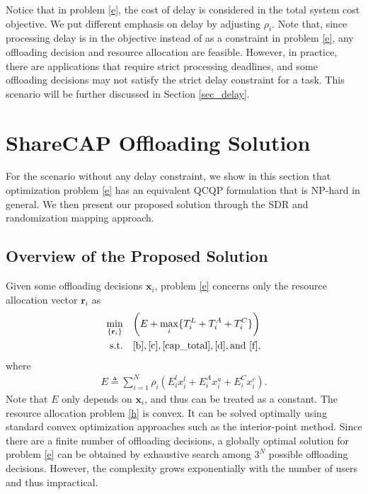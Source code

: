 \documentclass[10pt,journal,compsoc]{IEEEtran}
\begin{document}
Notice that in problem \eqref{e}, the cost of delay is considered in
the total system cost objective. We put different emphasis on delay
by adjusting $\rho_i$. Note that, since processing delay is in the
objective instead of as a constraint in problem \eqref{e}, any
offloading decision and resource allocation are feasible. However,
in practice, there are applications that require strict processing
deadlines, and some offloading decisions may not satisfy the strict
delay constraint for a task. This scenario will be further discussed
in Section \ref{sec_delay}.

\section{ShareCAP Offloading Solution}\label{sec_shareCAP_solution}
For the scenario without any delay constraint, we show in this
section that optimization problem \eqref{e} has an equivalent QCQP
formulation that is NP-hard in general. We then present our proposed
solution through the SDR and randomization mapping approach.

\subsection{Overview of the Proposed Solution}

Given some offloading decisions $\textbf{x}_i$, problem \eqref{e}
concerns only the resource allocation vector $\mathbf{r}_i$ as
\begin{align}
\min\limits_{\{\textbf{r}_i\}}
&\quad \bigg(E+\max_{i}\{T^L_{i}+T^A_{i}+T^C_{i}\}\bigg)\label{h}\\
\text{s.t.} &\quad \eqref{b},\eqref{c},\eqref{cap_total},\eqref{d},
\mathrm{and}\ \eqref{f},\nonumber
\end{align}
where
\begin{align*}
E\triangleq\sum_{i=1}^N\rho_i(E^l_{i}x^l_{i}+E^A_ix^a_{i}+E^C_ix^c_{i}).
\end{align*}
Note that $E$ only depends on $\textbf{x}_i$, and thus can be
treated as a constant. The resource allocation problem \eqref{h} is
convex. It can be solved optimally using standard convex
optimization approaches such as the interior-point method. Since
there are a finite number of offloading decisions, a globally
optimal solution for problem \eqref{e} can be obtained by exhaustive
search among $3^N$ possible offloading decisions. However, the
complexity grows exponentially with the number of users and thus
impractical.
\end{document}
